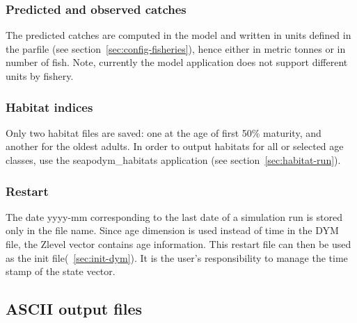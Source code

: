 \subsubsection{Predicted and observed catches}

The predicted catches are computed in the model and written in units defined in the parfile (see section~\ref{sec:config-fisheries}), hence either in metric tonnes or in number of fish. Note, currently the model application does not support different units by fishery. 
  
\subsubsection{Habitat indices}  
Only two habitat files are saved: one at the age of first 50\% maturity, and another for the oldest adults. In order to output habitats for all or selected age classes, use the {\ttfamily seapodym\_habitats} application (see section~\ref{sec:habitat-run}).

\subsubsection{Restart}\label{restart-dym}
The date {\ttfamily yyyy-mm} corresponding to the last date of a simulation run is stored only in the file name. Since age dimension is used instead of time in the DYM file, the Zlevel vector contains age information. This restart file can then be used as the {\ttfamily init file}(~\ref{sec:init-dym}). It is the user's responsibility to manage the time stamp of the state vector. 

\subsection{ASCII output files}

